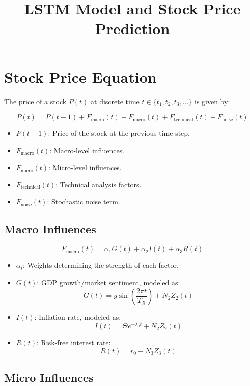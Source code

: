 \documentclass[12pt]{article}
\title{LSTM Model and Stock Price Prediction}
\author{}
\date{}
\begin{document}
\maketitle

\section*{Stock Price Equation}

The price of a stock \( P(t) \) at discrete time \( t \in \{t_1, t_2, t_3, \ldots\} \) is given by:

\[
P(t) = P(t-1) + F_{\text{macro}}(t) + F_{\text{micro}}(t) + F_{\text{technical}}(t) + F_{\text{noise}}(t)
\]

\begin{itemize}
    \item \( P(t-1) \): Price of the stock at the previous time step.
    \item \( F_{\text{macro}}(t) \): Macro-level influences.
    \item \( F_{\text{micro}}(t) \): Micro-level influences.
    \item \( F_{\text{technical}}(t) \): Technical analysis factors.
    \item \( F_{\text{noise}}(t) \): Stochastic noise term.
\end{itemize}

\subsection*{Macro Influences}

\[
F_{\text{macro}}(t) = \alpha_1 G(t) + \alpha_2 I(t) + \alpha_3 R(t)
\]

\begin{itemize}
    \item \( \alpha_i \): Weights determining the strength of each factor.
    \item \( G(t) \): GDP growth/market sentiment, modeled as:
    \[
    G(t) = y \sin\left(\frac{2\pi t}{T_B}\right) + N_2 Z_2(t)
    \]
    \item \( I(t) \): Inflation rate, modeled as:
    \[
    I(t) = \Theta e^{-\lambda_0 t} + N_2 Z_2(t)
    \]
    \item \( R(t) \): Risk-free interest rate:
    \[
    R(t) = r_0 + N_3 Z_3(t)
    \]
\end{itemize}

\subsection*{Micro Influences}
\end{document}
